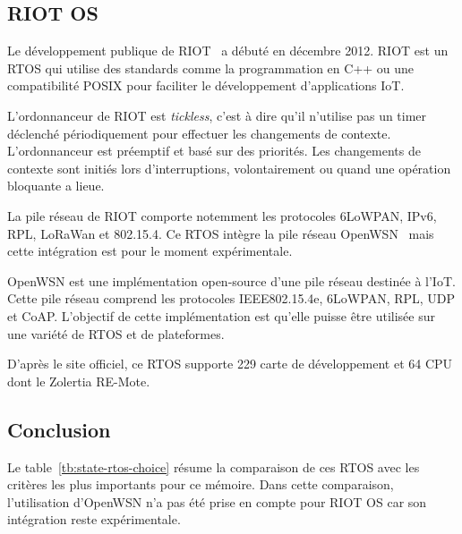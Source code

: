 \subsection*{RIOT OS}
    Le développement publique de RIOT~\cite{riotos} a débuté en décembre 2012\footnotemark[1].
    RIOT est un RTOS qui utilise des standards comme la programmation en C++ ou une compatibilité POSIX pour faciliter le développement d'applications IoT.

    L'ordonnanceur de RIOT est \textit{tickless}, c'est à dire qu'il n'utilise pas un timer déclenché périodiquement pour effectuer les changements de contexte. L'ordonnanceur est préemptif et basé sur des priorités. Les changements de contexte sont initiés lors d'interruptions, volontairement ou quand une opération bloquante a lieue. 

    La pile réseau de RIOT comporte notemment les protocoles 6LoWPAN, IPv6, RPL, LoRaWan et 802.15.4.
    Ce RTOS intègre la pile réseau OpenWSN~\cite{openwsn} mais cette intégration est pour le moment expérimentale.
    
    OpenWSN est une implémentation open-source d'une pile réseau destinée à l'IoT. Cette pile réseau comprend les protocoles IEEE802.15.4e, 6LoWPAN, RPL, UDP et CoAP. L'objectif de cette implémentation est qu'elle puisse être utilisée sur une variété de RTOS et de plateformes.

    D'après le site officiel, ce RTOS supporte 229 carte de développement et 64 CPU dont le Zolertia RE-Mote.


\subsection*{Conclusion}
Le table~\ref{tb:state-rtos-choice} résume la comparaison de ces RTOS avec les critères les plus importants pour ce mémoire. Dans cette comparaison, l'utilisation d'OpenWSN n'a pas été prise en compte pour RIOT OS car son intégration reste expérimentale.

